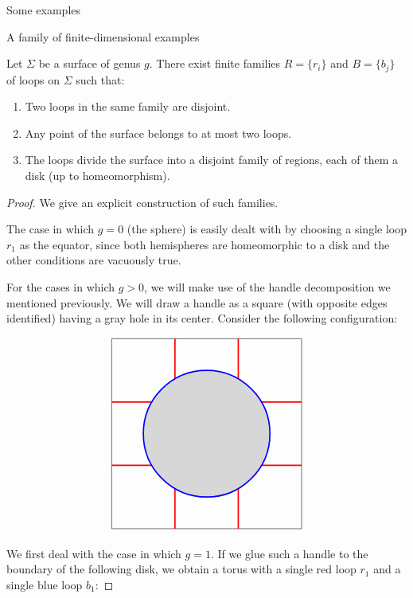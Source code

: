 \begin{chapter}{Some examples}
\begin{section}{A family of finite-dimensional examples}
\begin{prop}\label{surface-loops} Let $\Sigma$ be a surface of genus $g$. There exist finite families $R=\{r_i\}$ and $B=\{b_j\}$ of loops on $\Sigma$ such that:
\begin{enumerate}
\item Two loops in the same family are disjoint.
\item Any point of the surface belongs to at most two loops.
\item The loops divide the surface into a disjoint family of regions, each of them a disk (up to homeomorphism).
\end{enumerate}
\end{prop}

\begin{proof} We give an explicit construction of such families.

The case in which $g=0$ (the sphere) is easily dealt with by choosing a single loop $r_1$ as the equator, since both hemispheres are homeomorphic to a disk and the other conditions are vacuously true.

For the cases in which $g>0$, we will make use of the handle decomposition we mentioned previously. We will draw a handle as a square (with opposite edges identified) having a gray hole in its center. Consider the following configuration:

\begin{figure}[h]
\[
\begin{tikzpicture}
\draw (0,0) node[minimum size=6cm,draw] {};

\fill [black,opacity=.15] circle (2cm);

\draw[red, very thick] (-3,1) -- (-1.73,1);
\draw[red, very thick] (-3,-1) -- (-1.73,-1);

\draw[red, very thick] (3,1) -- (1.73,1);
\draw[red, very thick] (3,-1) -- (1.73,-1);

\draw[red, very thick] (1,-3) -- (1,-1.73);
\draw[red, very thick] (-1,-3) -- (-1,-1.73);

\draw[red, very thick] (1,3) -- (1,1.73);
\draw[red, very thick] (-1,3) -- (-1,1.73);

\draw[blue, very thick] (0,0) circle (2cm);
\end{tikzpicture}
\]
\end{figure}

We first deal with the case in which $g=1$. If we glue such a handle to the boundary of the following disk, we obtain a torus with a single red loop $r_1$ and a single blue loop $b_1$:


\end{proof}
\end{section}
\end{chapter}
